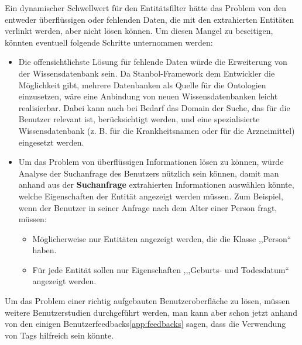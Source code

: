 Ein dynamischer Schwellwert für den Entitätsfilter hätte das Problem von den entweder überflüssigen oder fehlenden Daten, die mit den extrahierten Entitäten verlinkt werden, aber nicht lösen können. Um diesen Mangel zu beseitigen, könnten eventuell folgende Schritte unternommen werden:
\begin{itemize}
\item Die offensichtlichste Lösung für fehlende Daten würde die Erweiterung von der Wissensdatenbank sein. Da Stanbol-Framework dem Entwickler die Möglichkeit gibt, mehrere Datenbanken als Quelle für die Ontologien einzusetzen, wäre eine Anbindung von neuen Wissensdatenbanken leicht realisierbar. Dabei kann auch bei Bedarf das Domain der Suche, das für die Benutzer relevant ist, berücksichtigt werden, und eine spezialisierte Wissensdatenbank (z. B. für die Krankheitsnamen oder für die Arzneimittel) eingesetzt werden.
\item Um das Problem von überflüssigen Informationen lösen zu können, würde Analyse der Suchanfrage des Benutzers nützlich sein können, damit man anhand aus der \textbf{Suchanfrage} extrahierten Informationen auswählen könnte, welche Eigenschaften der Entität angezeigt werden müssen. Zum Beispiel, wenn der Benutzer in seiner Anfrage nach dem Alter einer Person fragt, müssen:
\begin{itemize}
\item Möglicherweise nur Entitäten angezeigt werden, die die Klasse ,,Person`` haben.
\item Für jede Entität sollen nur Eigenschaften ,,,Geburts- und Todesdatum`` angezeigt werden.
\end{itemize}
\end{itemize}

Um das Problem einer richtig aufgebauten Benutzeroberfläche zu lösen, müssen weitere Benutzerstudien durchgeführt werden, man kann aber schon jetzt anhand von den einigen Benutzerfeedbacks\ref{app:feedbacks} sagen, dass die Verwendung von Tags hilfreich sein könnte.

